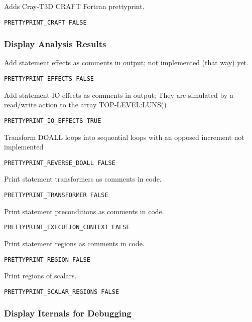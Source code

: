 Adds Cray-T3D CRAFT Fortran prettyprint.

\begin{verbatim}
PRETTYPRINT_CRAFT FALSE
\end{verbatim}

\subsubsection{Display Analysis Results}

Add statement effects as comments in output; not implemented (that way) yet.

\begin{verbatim}
PRETTYPRINT_EFFECTS FALSE
\end{verbatim}

Add statement IO-effects as comments in output; They are simulated by
a read/write action to the array TOP-LEVEL:LUNS()

\begin{verbatim}
PRETTYPRINT_IO_EFFECTS TRUE
\end{verbatim}

Transform DOALL loops into sequential loops with an opposed increment
not implemented

\begin{verbatim}
PRETTYPRINT_REVERSE_DOALL FALSE
\end{verbatim}

Print statement transformers as comments in code.

\begin{verbatim}
PRETTYPRINT_TRANSFORMER FALSE
\end{verbatim}

Print statement preconditions as comments in code.

\begin{verbatim}
PRETTYPRINT_EXECUTION_CONTEXT FALSE
\end{verbatim}

Print statement regions as comments in code.

\begin{verbatim}
PRETTYPRINT_REGION FALSE
\end{verbatim}

Print regions of scalars.

\begin{verbatim}
PRETTYPRINT_SCALAR_REGIONS FALSE
\end{verbatim}

\subsubsection{Display Iternals for Debugging}

